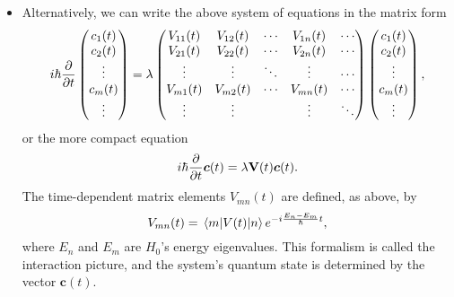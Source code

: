 \documentclass[11pt, a4paper]{article}
\renewcommand{\vec}[1]{\bm{#1}}  %
\newcommand{\mat}[1]{\mathbf{#1}}  %
\begin{document}
\begin{itemize}
    \item Alternatively, we can write the above system of equations in the matrix form
    \begin{equation*}
        i \hbar \pdv{t} 
        \begin{pmatrix}
            c_{1}(t)\\
            c_{2}(t)\\
            \vdots\\
            c_{m}(t)\\
            \vdots
        \end{pmatrix}
        = \lambda
        \begin{pmatrix}
            V_{11}(t) & V_{12}(t) & \cdots & V_{1n}(t) & \cdots \\
            V_{21}(t) & V_{22}(t) & \cdots & V_{2n}(t) & \cdots \\
            \vdots & \vdots & \ddots & \vdots & \cdots \\
            V_{m1}(t) & V_{m2}(t) & \cdots & V_{mn}(t) & \cdots \\
            \vdots & \vdots &  & \vdots & \ddots 
        \end{pmatrix}
        \begin{pmatrix}
            c_{1}(t)\\
            c_{2}(t)\\
            \vdots\\
            c_{m}(t)\\
            \vdots
        \end{pmatrix},
    \end{equation*}
    or the more compact equation
    \begin{equation*}
        i \hbar \pdv{t} \vec{c}(t) = \lambda \mat{V}(t) \vec{c}(t).
    \end{equation*}
    The time-dependent matrix elements $ V_{mn}(t) $ are defined, as above, by
    \begin{equation*}
        V_{mn}(t) = \mel{m}{V(t)}{n} e^{-i \frac{E_{n} - E_{m}}{\hbar}t},
    \end{equation*}
    where $ E_{n} $ and $ E_{m} $ are $ H_{0} $'s energy eigenvalues. This formalism is called the interaction picture, and the system's quantum state is determined by the vector $ \vec{c}(t) $.

\end{itemize}
\end{document}
